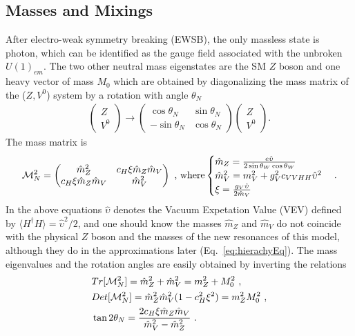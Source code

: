 \subsection*{Masses and Mixings}
After electro-weak symmetry breaking (EWSB), the only massless state is photon, which can be identified as the gauge field associated with the unbroken $U(1)_{em}$. The two other neutral mass eigenstates are the SM $Z$ boson and one heavy vector of mass $M_{0}$ which are obtained by diagonalizing the mass matrix of the ($Z,V^{0}$) system by a rotation with angle $\theta_{N}$
\begin{align}
  \begin{pmatrix}
    Z\\
    V^{0}
  \end{pmatrix}
  \rightarrow
  \begin{pmatrix}
    \cos{\theta_{N}} & \sin{\theta_{N}}\\
    -\sin{\theta_{N}}& \cos{\theta_{N}}
  \end{pmatrix}
  \begin{pmatrix}
    Z\\
    V^{0}
  \end{pmatrix}
  .
\end{align}
The mass matrix is
\begin{align}
  \label{eq:MassMatrixN}
  \mathcal{M}_{N}^{2}=
  \begin{pmatrix}
    \hat{m}_{Z}^{2} & c_{H}\xi \hat{m}_{Z} \hat{m}_{V}\\
    c_{H}\xi \hat{m}_{Z} \hat{m}_{V} & \hat{m}_{V}^{2}
  \end{pmatrix}
  \textup{ , where}
  \begin{cases}
    \hat{m}_{Z}=\frac{e\hat{\upsilon}}{2\sin{\theta_{W}}\cos{\theta_{W}}}\\
    \hat{m}_{V}^{2}=m_{V}^{2}+g_{V}^{2}c_{VVHH}\hat{\upsilon}^{2}\\
    \xi=\frac{g_{V}\hat{\upsilon}}{2\hat{m}_{V}}
  \end{cases}
  .
\end{align}
In the above equations $\hat{\upsilon}$ denotes the Vacuum Expetation Value (VEV) defined by $\big \langle H^{\dagger}H\big \rangle=\hat{\upsilon}^{2}/2$, and one should know the masses $\hat{m}_{Z}$ and $\hat{m}_{V}$ do not coincide with the physical $Z$ boson and the masses of the new resonances of this model, although they do in the approximations later (Eq.~\ref{eq:hierachyEq}). The mass eigenvalues and the rotation angles are easily obtained by inverting the relations
\begin{align}
  \label{eq:detMN}
  &Tr[\mathcal{M}_{N}^{2}]=\hat{m}_{Z}^{2}+\hat{m}_{V}^{2}=m_{Z}^{2}+M_{0}^{2}\textup{ ,}\nonumber\\
  &Det[\mathcal{M}_{N}^{2}]=\hat{m}_{Z}^{2}\hat{m}_{V}^{2}(1-c_{H}^{2}\xi^{2})=m_{Z}^{2}M_{0}^{2}\textup{ ,}\nonumber\\
  &\tan{2\theta_{N}}=\frac{2c_{H}\xi \hat{m}_{Z} \hat{m}_{V}}{\hat{m}_{V}^{2}-\hat{m}_{Z}^{2}}\textup{ .}
\end{align}
